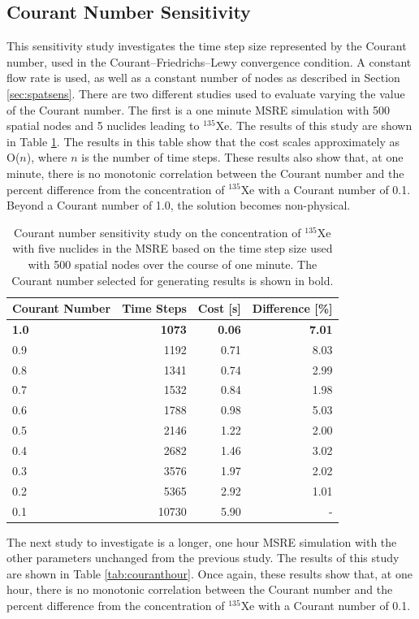 \documentclass{style/nseJournal}
\begin{document}
\subsection{Courant Number Sensitivity}
\label{sec:CFL}
This sensitivity study investigates the time step size represented by the Courant number, used in the Courant–Friedrichs–Lewy convergence condition.
A constant flow rate is used, as well as a constant number of nodes as described in Section \ref{sec:spatsens}.
There are two different studies used to evaluate varying the value of the Courant number.
The first is a one minute MSRE simulation with 500 spatial nodes and 5 nuclides leading to $^{135}$Xe.
The results of this study are shown in Table \ref{tab:courantmin}.
The results in this table show that the cost scales approximately as O($n$), where $n$ is the number of time steps.
These results also show that, at one minute, there is no monotonic correlation between the Courant number and the percent difference from the concentration of $^{135}$Xe with a Courant number of 0.1.
Beyond a Courant number of 1.0, the solution becomes non-physical.

\begin{table}[!ht]
    \centering
    \caption{Courant number sensitivity study on the concentration of $^{135}$Xe with five nuclides in the MSRE based on the time step size used with 500 spatial nodes over the course of one minute. The Courant number selected for generating results is shown in bold.}
    \begin{tabular}{l r r r}
    \hline
Courant Number & Time Steps & Cost [s] & Difference [\%] \\
\hline
\textbf{1.0} & \textbf{1073} & \textbf{0.06} & \textbf{7.01} \\
0.9 & 1192 & 0.71 & 8.03 \\
0.8 & 1341 & 0.74 & 2.99 \\
0.7 & 1532 & 0.84 & 1.98 \\
0.6 & 1788 & 0.98 & 5.03 \\
0.5 & 2146 & 1.22 & 2.00 \\
0.4 & 2682 & 1.46 & 3.02 \\
0.3 & 3576 & 1.97 & 2.02 \\
0.2 & 5365 & 2.92 & 1.01 \\
0.1 & 10730 & 5.90 & - \\
\hline
    \end{tabular}
    \label{tab:courantmin}
\end{table}

The next study to investigate is a longer, one hour MSRE simulation with the other parameters unchanged from the previous study.
The results of this study are shown in Table \ref{tab:couranthour}.
Once again, these results show that, at one hour, there is no monotonic correlation between the Courant number and the percent difference from the concentration of $^{135}$Xe with a Courant number of 0.1.
\end{document}
